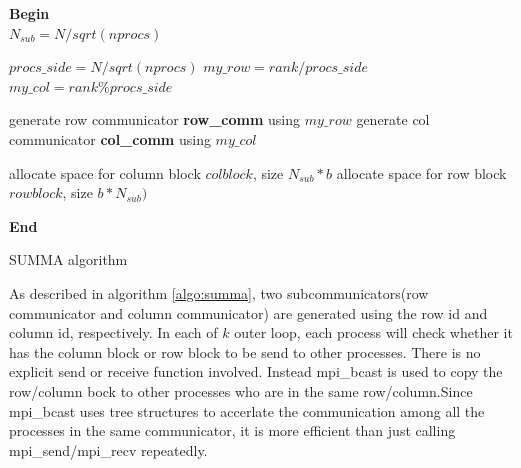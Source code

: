 \documentclass{ics-paper}
\begin{document}
\begin{algorithm}
	\SetAlgoLined


	\textbf{Begin} \\
	$N_{sub}=N/sqrt(nprocs)$ \;
	
	$procs\_side=N/sqrt(nprocs)$ \;
	$my\_row = rank/procs\_side$\;
	$my\_col = rank\%procs\_side$ \;
	
	generate row communicator \textbf{row\_comm} using $my\_row$ \;
	generate col communicator \textbf{col\_comm} using $my\_col$ \;

	allocate space for column block $colblock$, size $N_{sub}*b$ \;
	allocate space for row block $rowblock$, size $b*N_{sub})$ \;

	
	
	\textbf{End} 
	\caption{SUMMA algorithm}
	\label{algo:summa}
\end{algorithm}

As described in algorithm \ref{algo:summa}, two subcommunicators(row communicator and column communicator) are generated using the row id and column id, respectively. In each of $k$ outer loop, each process will check whether it has the column block or row block to be send to other processes. There is no explicit send or receive function involved. Instead mpi\_bcast is used to copy the row/column bock to other processes who are in the same row/column.Since mpi\_bcast uses tree structures to accerlate the communication among all the processes in the same communicator, it is more efficient than just calling mpi\_send/mpi\_recv repeatedly.
\label{sec:algo}
\end{document}
